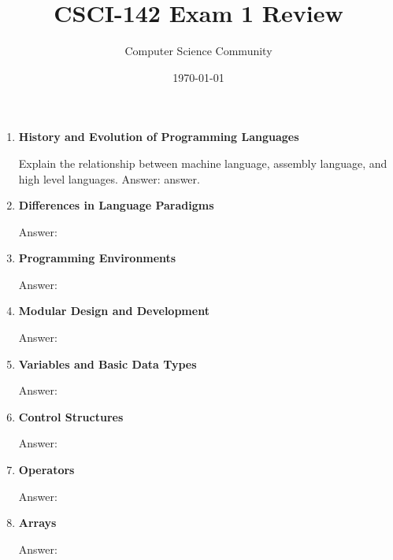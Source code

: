 \documentclass[11pt]{article}
\title{CSCI-142 Exam 1 Review}
\author{Computer Science Community}
\date{\today}
\newenvironment{answer}{\large\lstset{basicstyle=\tiny\ttfamily}\color{white} \small{Answer:}}{}
\newenvironment{answer}{\large\lstset{basicstyle=\large\ttfamily}\color{red} \small{Answer:}}{}
\begin{document}
\header
	\begin{enumerate}

\item \textbf{History and Evolution of Programming Languages}

Explain the relationship between machine language, assembly language, and high level languages.
\begin{answer}
answer.
\end{answer}



\item \textbf{Differences in Language Paradigms}

\begin{answer}
\end{answer}



\item \textbf{Programming Environments}

\begin{answer}
\end{answer}



\item \textbf{Modular Design and Development}

\begin{answer}
\end{answer}



\item \textbf{Variables and Basic Data Types}

\begin{answer}
\end{answer}



\item \textbf{Control Structures}

\begin{answer}
\end{answer}



\item \textbf{Operators}

\begin{answer}
\end{answer}



\item \textbf{Arrays}

\begin{answer}
\end{answer}




\end{enumerate}
\end{document}
